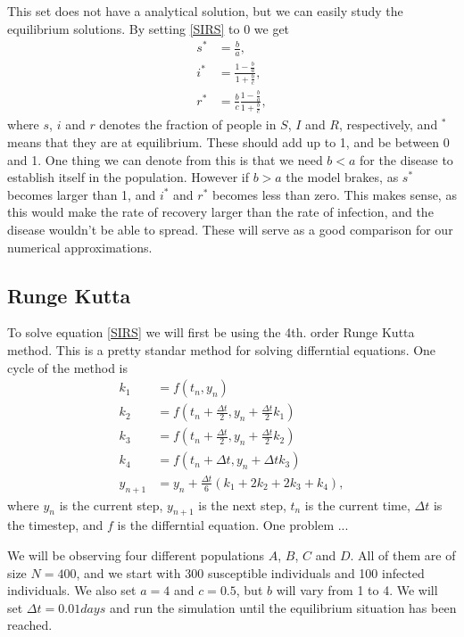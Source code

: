 \documentclass[a4paper]{article}
\let\Oldsubsection\subsection
\renewcommand{\subsection}{\FloatBarrier\Oldsubsection}
\begin{document}
This set does not have a analytical solution, but we can easily study the equilibrium solutions. By setting \ref{SIRS} to 0 we get 
\begin{align} 
s ^ { * } & = \frac { b } { a }, \\ 
i ^ { * } & = \frac { 1 - \frac { b } { a } } { 1 + \frac { b } { c } }, \\ 
r ^ { * } & = \frac { b } { c } \frac { 1 - \frac { b } { a } } { 1 +  \frac{b}{c} }, \label{SIRS_eq}
\end{align}
where $s$, $i$ and $r$ denotes the fraction of people in $S$, $I$ and $R$, respectively, and $^*$ means that they are at equilibrium. These should add up to 1, and be between 0 and 1. 
One thing we can denote from this is that we need $b < a$ for the disease to establish itself in the population. However if $b>a$ the model brakes, as $s^*$ becomes larger than 1, and $i^*$ and $r^*$ becomes less than zero. This makes sense, as this would make the rate of recovery larger than the rate of infection, and the disease wouldn't be able to spread. 
These will serve as a good comparison for our numerical approximations. 


\subsection{Runge Kutta}
To solve equation \ref{SIRS} we will first be using the 4th. order Runge Kutta method. This is a pretty standar method for solving differntial equations. One cycle of the method is
\begin{align}
k_1 &= f(t_n,y_n) \\
k_2 &= f(t_n + \frac{\Delta t}{2},y_n + \frac{\Delta t}{2} k_1) \\
k_3 &= f(t_n + \frac{\Delta t}{2},y_n + \frac{\Delta t}{2} k_2) \\
k_4 &= f(t_n + \Delta t, y_n + \Delta t k_3) \\
y_{n+1} &= y_n + \frac{\Delta t}{6} \left( k_1 + 2k_2 + 2k_3 + k_4 \right),
\end{align}
where $y_n$ is the current step, $y_{n+1}$ is the next step, $t_n$ is the current time, $\Delta t$ is the timestep, and $f$ is the differntial equation. 
One problem ...

We will be observing four different populations $A$, $B$, $C$ and $D$. All of them are of size $N = 400$, and we start with 300 susceptible individuals and 100 infected individuals. We also set $a=4$ and $c=0.5$, but $b$ will vary from 1 to 4. We will set $\Delta t = 0.01 days$ and run the simulation until the equilibrium situation has been reached. 
\end{document}
